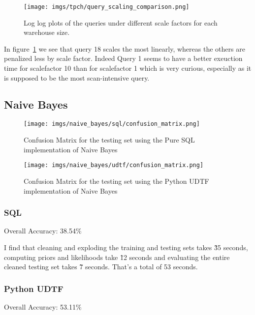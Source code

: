 \documentclass{article}
\begin{document}
\begin{figure}[htbp]
    \centering
    \texttt{[image: imgs/tpch/query\_scaling\_comparison.png]}
    \caption{Log log plots of the queries under different scale factors for each warehouse size. }
    \label{fig:query_scaling_comp}
\end{figure}

In figure~\ref{fig:query_scaling_comp} we see that query 18 scales the most linearly, whereas the others are penalized less by scale factor. Indeed Query 1 seems to have a better exeuction time for scalefactor 10 than for scalefactor 1 which is very curious, especially as it is supposed to be the most scan-intensive query. 

\FloatBarrier

\subsection{Naive Bayes}
\begin{figure}[htbp]
    \centering
    \begin{minipage}{0.48\textwidth}
        \centering
        \texttt{[image: imgs/naive\_bayes/sql/confusion\_matrix.png]}
        \caption{Confusion Matrix for the testing set using the Pure SQL implementation of Naive Bayes}
        \label{fig:pure_sql_confusion_matrix}
    \end{minipage}
    \hfill
    \begin{minipage}{0.48\textwidth}
        \centering
        \texttt{[image: imgs/naive\_bayes/udtf/confusion\_matrix.png]}
        \caption{Confusion Matrix for the testing set using the Python UDTF implementation of Naive Bayes}
        \label{fig:udtf_confusion_matrix}
    \end{minipage}
\end{figure}

\subsubsection{SQL}
Overall Accuracy: 38.54\%

\medskip \noindent I find that cleaning and exploding the training and testing sets takes \~35 seconds, computing priors and likelihoods take \~12 seconds and evaluating the entire cleaned testing set takes \~7 seconds. That's a total of 53 seconds. 

\subsubsection{Python UDTF}
Overall Accuracy: 53.11\%
\end{document}
